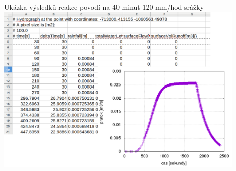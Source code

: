         \begin{frame}[plain]
            Ukázka výsledků reakce povodí na 40 minut 120 mm/hod srážky
                    \includegraphics[width=0.9\textwidth]{obr/pointtab.png}
        \end{frame}
